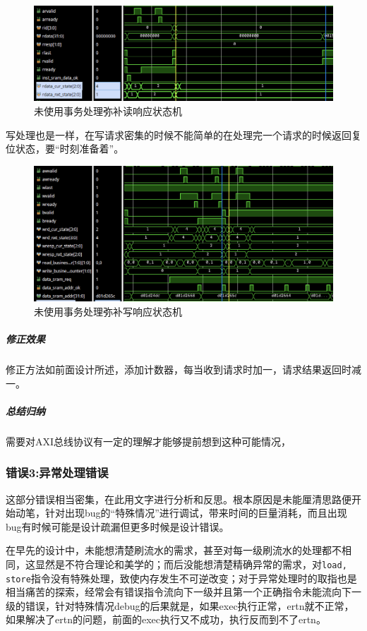 \documentclass[UTF-8,twoside,c5size]{ctexart}
\begin{document}
	\begin{figure}[h]
		\centering
		\includegraphics[width=0.8\linewidth]{rdata_business.png}
		\caption[rdata_business]{未使用事务处理弥补读响应状态机}
		\label{fig:rdata_business}
	\end{figure}
	
	写处理也是一样，在写请求密集的时候不能简单的在处理完一个请求的时候返回复位状态，要“时刻准备着”。
	
	\begin{figure}[h]
		\centering
		\includegraphics[width=0.8\linewidth]{wdata_business.png}
		\caption[wdata_business]{未使用事务处理弥补写响应状态机}
		\label{fig:wdata_business}
	\end{figure}
	
	\subparagraph{修正效果}\hfill
	
	修正方法如前面设计所述，添加计数器，每当收到请求时加一，请求结果返回时减一。
	
	\subparagraph{总结归纳}\hfill
	
	需要对AXI总线协议有一定的理解才能够提前想到这种可能情况，
	
	\subsubsection{错误\textbf{3:}异常处理错误}
	
	这部分错误相当密集，在此用文字进行分析和反思。根本原因是未能厘清思路便开始动笔，针对出现bug的“特殊情况”进行调试，带来时间的巨量消耗，而且出现bug有时候可能是设计疏漏但更多时候是设计错误。
	
	在早先的设计中，未能想清楚刷流水的需求，甚至对每一级刷流水的处理都不相同，这显然是不符合理论和美学的；而后没能想清楚精确异常的需求，对\texttt{load, store}指令没有特殊处理，致使内存发生不可逆改变；对于异常处理时的取指也是相当痛苦的探索，经常会有错误指令流向下一级并且第一个正确指令未能流向下一级的错误，针对特殊情况debug的后果就是，如果exec执行正常，ertn就不正常，如果解决了ertn的问题，前面的exec执行又不成功，执行反而到不了ertn。
	
\end{document}
